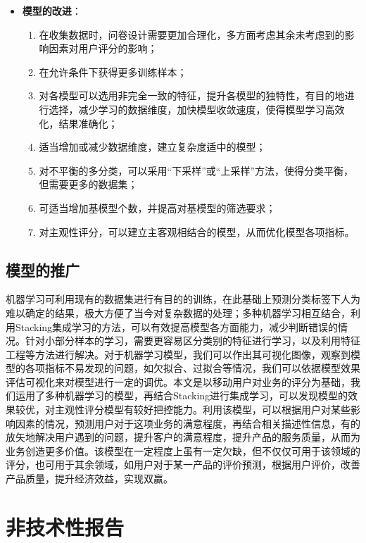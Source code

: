 \documentclass{MathorCupmodeling}
\begin{document}
\begin{itemize}
\begin{enumerate}
			\end{enumerate}
		\newpage
		\item \textbf{模型的改进}：
			\begin{enumerate}
				\item 在收集数据时，问卷设计需要更加合理化，多方面考虑其余未考虑到的影响因素对用户评分的影响；
				\item 在允许条件下获得更多训练样本；
				\item 对各模型可以选用非完全一致的特征，提升各模型的独特性，有目的地进行选择，减少学习的数据维度，加快模型收敛速度，使得模型学习高效化，结果准确化；
				\item 适当增加或减少数据维度，建立复杂度适中的模型；
				\item 对不平衡的多分类，可以采用“下采样”或“上采样”方法，使得分类平衡，但需要更多的数据集；
				\item 可适当增加基模型个数，并提高对基模型的筛选要求；
				\item 对主观性评分，可以建立主客观相结合的模型，从而优化模型各项指标。
			\end{enumerate}
	\end{itemize}
	\subsection{模型的推广}
	机器学习可利用现有的数据集进行有目的的训练，在此基础上预测分类标签下人为难以确定的结果，极大方便了当今对复杂数据的处理；多种机器学习相互结合，利用Stacking集成学习的方法，可以有效提高模型各方面能力，减少判断错误的情况。针对小部分样本的学习，需要更容易区分类别的特征进行学习，以及利用特征工程等方法进行解决。对于机器学习模型，我们可以作出其可视化图像，观察到模型的各项指标不易发现的问题，如欠拟合、过拟合等情况，我们可以依据模型效果评估可视化来对模型进行一定的调优。本文是以移动用户对业务的评分为基础，我们运用了多种机器学习的模型，再结合Stacking进行集成学习，可以发现模型的效果较优，对主观性评分模型有较好把控能力。利用该模型，可以根据用户对某些影响因素的情况，预测用户对于这项业务的满意程度，再结合相关描述性信息，有的放矢地解决用户遇到的问题，提升客户的满意程度，提升产品的服务质量，从而为业务创造更多价值。该模型在一定程度上虽有一定欠缺，但不仅仅可用于该领域的评分，也可用于其余领域，如用户对于某一产品的评价预测，根据用户评价，改善产品质量，提升经济效益，实现双赢。
	\newpage
	\section{非技术性报告}
	
\end{document}

